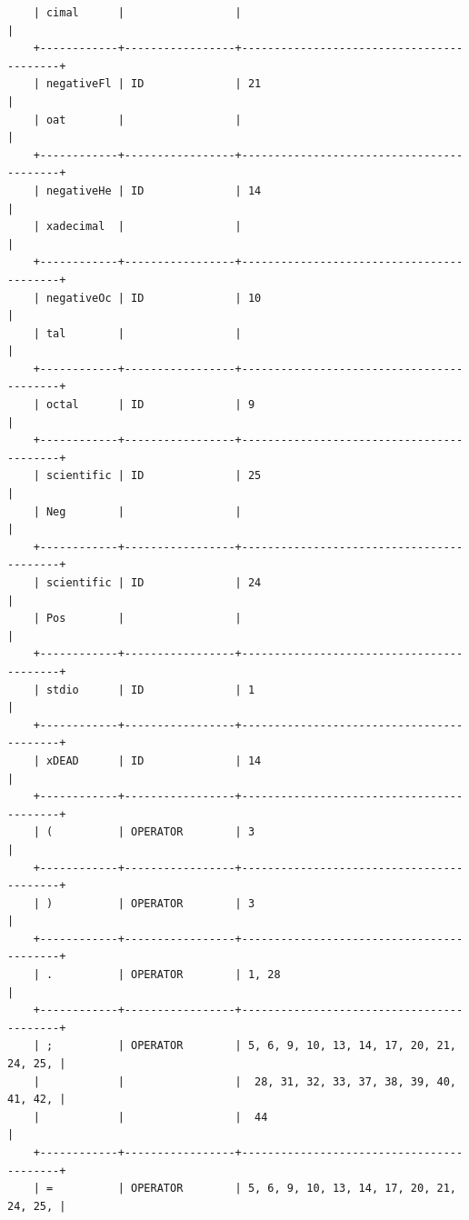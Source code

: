 \documentclass[a4paper,12pt]{article}
\begin{document}
\begin{flushleft}
\begin{verbatim}
	| cimal      |                 |                                          |
	+------------+-----------------+------------------------------------------+
	| negativeFl | ID              | 21                                       |
	| oat        |                 |                                          |
	+------------+-----------------+------------------------------------------+
	| negativeHe | ID              | 14                                       |
	| xadecimal  |                 |                                          |
	+------------+-----------------+------------------------------------------+
	| negativeOc | ID              | 10                                       |
	| tal        |                 |                                          |
	+------------+-----------------+------------------------------------------+
	| octal      | ID              | 9                                        |
	+------------+-----------------+------------------------------------------+
	| scientific | ID              | 25                                       |
	| Neg        |                 |                                          |
	+------------+-----------------+------------------------------------------+
	| scientific | ID              | 24                                       |
	| Pos        |                 |                                          |
	+------------+-----------------+------------------------------------------+
	| stdio      | ID              | 1                                        |
	+------------+-----------------+------------------------------------------+
	| xDEAD      | ID              | 14                                       |
	+------------+-----------------+------------------------------------------+
	| (          | OPERATOR        | 3                                        |
	+------------+-----------------+------------------------------------------+
	| )          | OPERATOR        | 3                                        |
	+------------+-----------------+------------------------------------------+
	| .          | OPERATOR        | 1, 28                                    |
	+------------+-----------------+------------------------------------------+
	| ;          | OPERATOR        | 5, 6, 9, 10, 13, 14, 17, 20, 21, 24, 25, |
	|            |                 |  28, 31, 32, 33, 37, 38, 39, 40, 41, 42, |
	|            |                 |  44                                      |
	+------------+-----------------+------------------------------------------+
	| =          | OPERATOR        | 5, 6, 9, 10, 13, 14, 17, 20, 21, 24, 25, |

\end{verbatim}
\end{flushleft}
\end{document}
